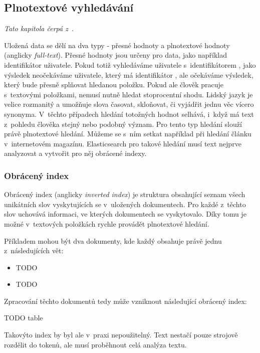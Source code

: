 \subsection{Plnotextové vyhledávání}
\emph{Tato kapitola čerpá z~\cite{bib:elastic-defnitive}}.

Uložená data se dělí na dva typy - přesné hodnoty a plnotextové hodnoty (anglicky \emph{full-text}). Přesné hodnoty jsou určeny pro data, jako například identifikátor uživatele. Pokud totiž vyhledáváme uživatele s~identifikátorem , jako výsledek neočekáváme uživatele, který má identifikátor , ale očekáváme výsledek, který bude přesně splňovat hledanou položku.
Pokud ale člověk pracuje s~textovými položkami, nemusí nutně hledat stoprocentní shodu. Lidský jazyk je velice rozmanitý a umožňuje slova časovat, skloňovat, či vyjádřit jednu věc vícero synonyma. %
V~těchto případech hledání totožných hodnot selhává, i~když má text z~pohledu člověka stejný nebo podobný význam. Pro tento typ hledání slouží právě plnotextové hledání. Můžeme se s~ním setkat například při hledání článku v~internetovém magazínu.
Elasticsearch pro takové hledání musí text nejprve analyzovat a vytvořit pro něj obrácené indexy.

\subsubsection*{Obrácený index}
Obrácený index (anglicky \emph{inverted index}) je struktura obsahující seznam všech unikátních slov vyskytujících se v~uložených dokumentech. Pro každé z~těchto slov uchovává informaci, ve kterých dokumentech se vyskytovalo. Díky tomu je možné v~textových položkách rychle provádět plnotextové hledání.

Příkladem mohou být dva dokumenty, kde každý obsahuje právě jednu z~následujících vět:
\begin{itemize}
    \item TODO
    \item TODO
\end{itemize}
Zpracování těchto dokumentů tedy může vzniknout následující obrácený index:

TODO table

Takovýto index by byl ale v~praxi nepoužitelný. Text nestačí pouze strojově rozdělit do tokenů, ale musí proběhnout celá analýza textu.


